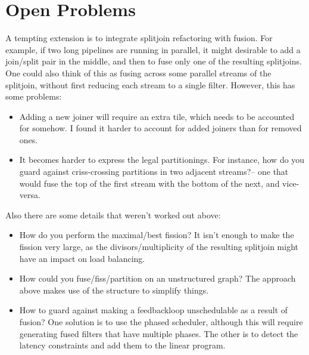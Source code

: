 \documentclass[12pt]{article}
\begin{document}
  \section{Open Problems}

  A tempting extension is to integrate splitjoin refactoring with
  fusion.  For example, if two long pipelines are running in parallel,
  it might desirable to add a join/split pair in the middle, and then
  to fuse only one of the resulting splitjoins.  One could also think
  of this as fusing across some parallel streams of the splitjoin,
  without first reducing each stream to a single filter.  However,
  this has some problems:
  \begin{itemize}

    \item Adding a new joiner will require an extra tile, which needs
    to be accounted for somehow.  I found it harder to account for
    added joiners than for removed ones.

    \item It becomes harder to express the legal partitionings.  For
    instance, how do you guard against criss-crossing partitions in
    two adjacent streams?-- one that would fuse the top of the first
    stream with the bottom of the next, and vice-versa.

  \end{itemize}
  Also there are some details that weren't worked out above:
  \begin{itemize}

    \item How do you perform the maximal/best fission?  It isn't
    enough to make the fission very large, as the
    divisors/multiplicity of the resulting splitjoin might have an
    impact on load balancing.

    \item How could you fuse/fiss/partition on an unstructured graph?
    The approach above makes use of the structure to simplify things.

    \item How to guard against making a feedbackloop unschedulable as
    a result of fusion?  One solution is to use the phased scheduler,
    although this will require generating fused filters that have
    multiple phases.  The other is to detect the latency constraints
    and add them to the linear program.
    
  \end{itemize}
\end{document}
